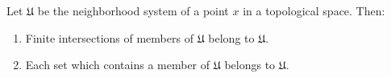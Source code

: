 Let $\mathfrak{U}$ be the neighborhood system of a point $x$ in a topological space. Then:

\begin{enumerate}
\item Finite intersections of members of $\mathfrak{U}$ belong to $\mathfrak{U}$.
\item Each set which contains a member of $\mathfrak{U}$ belongs to $\mathfrak{U}$.
\end{enumerate}
